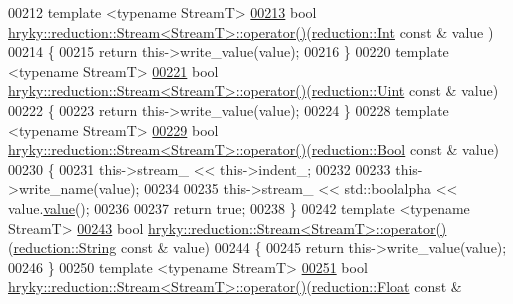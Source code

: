 \begin{DoxyCode}
00212 \textcolor{comment}{}\textcolor{keyword}{template} <\textcolor{keyword}{typename} StreamT>
\hypertarget{reduction__stream_8h_source_l00213}{}\hyperlink{classhryky_1_1reduction_1_1_stream_af94ad7305cc5e232aff63689f98f5b98}{00213} \textcolor{keywordtype}{bool} \hyperlink{classhryky_1_1reduction_1_1_stream}{hryky::reduction::Stream<StreamT>::operator()}(\hyperlink{classhryky_1_1reduction_1_1_int}{reduction::Int} \textcolor{keyword}{const} & value
      )
00214 \{
00215     \textcolor{keywordflow}{return} this->write\_value(value);
00216 \}
00220 \textcolor{keyword}{template} <\textcolor{keyword}{typename} StreamT>
\hypertarget{reduction__stream_8h_source_l00221}{}\hyperlink{classhryky_1_1reduction_1_1_stream_a85c5361f5dd26d12703bcaaf49d70669}{00221} \textcolor{keywordtype}{bool} \hyperlink{classhryky_1_1reduction_1_1_stream}{hryky::reduction::Stream<StreamT>::operator()}(\hyperlink{classhryky_1_1reduction_1_1_uint}{reduction::Uint} \textcolor{keyword}{const} & 
      value)
00222 \{
00223     \textcolor{keywordflow}{return} this->write\_value(value);
00224 \}
00228 \textcolor{keyword}{template} <\textcolor{keyword}{typename} StreamT>
\hypertarget{reduction__stream_8h_source_l00229}{}\hyperlink{classhryky_1_1reduction_1_1_stream_af34bc9677442da4751a758af377b2a66}{00229} \textcolor{keywordtype}{bool} \hyperlink{classhryky_1_1reduction_1_1_stream}{hryky::reduction::Stream<StreamT>::operator()}(\hyperlink{classhryky_1_1reduction_1_1_bool}{reduction::Bool} \textcolor{keyword}{const} & 
      value)
00230 \{
00231     this->stream\_ << this->indent\_;
00232 
00233     this->write\_name(value);
00234 
00235     this->stream\_ << std::boolalpha << value.\hyperlink{classhryky_1_1reduction_1_1_bool_adc9dc3d2690f737eace344341033c6ce}{value}();
00236 
00237     \textcolor{keywordflow}{return} \textcolor{keyword}{true};
00238 \}
00242 \textcolor{keyword}{template} <\textcolor{keyword}{typename} StreamT>
\hypertarget{reduction__stream_8h_source_l00243}{}\hyperlink{classhryky_1_1reduction_1_1_stream_a38aa345324ef7f0e1c0aab7bb38915b1}{00243} \textcolor{keywordtype}{bool} \hyperlink{classhryky_1_1reduction_1_1_stream}{hryky::reduction::Stream<StreamT>::operator()}(\hyperlink{classhryky_1_1reduction_1_1_string}{reduction::String} \textcolor{keyword}{const} & 
      value)
00244 \{
00245     \textcolor{keywordflow}{return} this->write\_value(value);
00246 \}
00250 \textcolor{keyword}{template} <\textcolor{keyword}{typename} StreamT>
\hypertarget{reduction__stream_8h_source_l00251}{}\hyperlink{classhryky_1_1reduction_1_1_stream_ae44e119022d635cd54049729e29ba770}{00251} \textcolor{keywordtype}{bool} \hyperlink{classhryky_1_1reduction_1_1_stream}{hryky::reduction::Stream<StreamT>::operator()}(\hyperlink{classhryky_1_1reduction_1_1_float}{reduction::Float} \textcolor{keyword}{const} & 

\end{DoxyCode}
